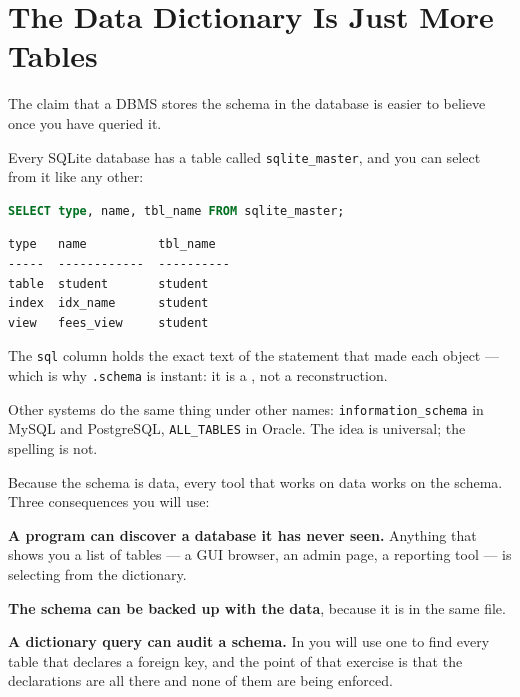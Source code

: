 \section{The Data Dictionary Is Just More Tables}

The claim that a DBMS stores the schema in the database is easier to believe
once you have queried it.

\begin{examplebox}
Every SQLite database has a table called \texttt{sqlite\_master}, and you can
select from it like any other:

\begin{lstlisting}[language=sql]
SELECT type, name, tbl_name FROM sqlite_master;
\end{lstlisting}

\begin{lstlisting}
type   name          tbl_name
-----  ------------  ----------
table  student       student
index  idx_name      student
view   fees_view     student
\end{lstlisting}

The \texttt{sql} column holds the exact text of the  statement
that made each object --- which is why \texttt{.schema} is instant: it is a
, not a reconstruction.

\smallskip
Other systems do the same thing under other names:
\texttt{information\_schema} in MySQL and PostgreSQL,
\texttt{ALL\_TABLES} in Oracle. The idea is universal; the spelling is not.
\end{examplebox}

\begin{conceptbox}
Because the schema is data, every tool that works on data works on the schema.
Three consequences you will use:

\begin{tight}
  \item \textbf{A program can discover a database it has never seen.} Anything
        that shows you a list of tables --- a GUI browser, an admin page, a
        reporting tool --- is selecting from the dictionary.
  \item \textbf{The schema can be backed up with the data}, because it is in
        the same file.
  \item \textbf{A dictionary query can audit a schema.} In 
        you will use one to find every table that declares a foreign key, and
        the point of that exercise is that the declarations are all there and
        none of them are being enforced.
\end{tight}
\end{conceptbox}

